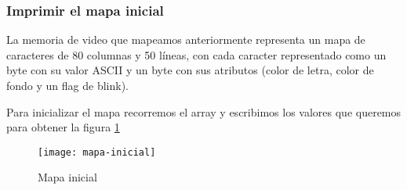 \subsubsection{Imprimir el mapa inicial}

La memoria de video que mapeamos anteriormente representa un mapa de caracteres de 80 columnas y 50 líneas, con cada caracter representado como un byte con su valor ASCII y un byte con sus atributos (color de letra, color de fondo y un flag de blink).

Para inicializar el mapa recorremos el array y escribimos los valores que queremos para obtener la figura \ref{fig:mapa-inicial}

\begin{figure}[H]
    \centering
    \texttt{[image: mapa-inicial]}
    \caption{Mapa inicial}
    \label{fig:mapa-inicial}
\end{figure}

